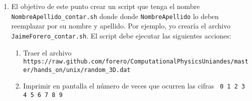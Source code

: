 \documentclass{article}
\begin{document}
\begin{enumerate}
\begin{enumerate}
\end{enumerate}
\item
El objetivo de este punto crear un script que tenga el nombre \verb"NombreApellido_contar.sh" donde donde \verb"NombreApellido" lo deben reemplazar por su nombre y apellido. Por ejemplo, yo crear\'ia el archivo \verb"JaimeForero_contar.sh". El script debe ejecutar las siguientes acciones:
\begin{enumerate}
\item Traer el archivo \verb"https://raw.github.com/forero/"\newline \verb"ComputationalPhysicsUniandes/master/hands_on/unix/random_3D.dat"
\item Imprimir en pantalla el n\'umero de veces que ocurren las cifras {\texttt{ 0 1 2 3 4 5 6 7 8 9}}
\end{enumerate}
\end{enumerate}
\end{document}
